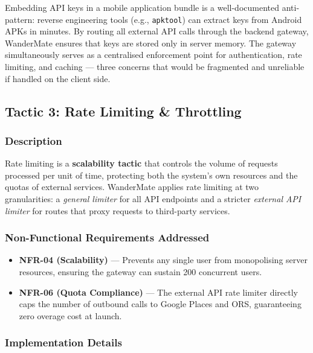 \documentclass[12pt, a4paper]{article}
\newcommand{\code}[1]{\texttt{\small #1}}
\begin{document}
Embedding API keys in a mobile application bundle is a well-documented anti-pattern: reverse engineering tools (e.g., \code{apktool}) can extract keys from Android APKs in minutes. By routing all external API calls through the backend gateway, WanderMate ensures that keys are stored only in server memory. The gateway simultaneously serves as a centralised enforcement point for authentication, rate limiting, and caching --- three concerns that would be fragmented and unreliable if handled on the client side.

\subsection{Tactic 3: Rate Limiting \& Throttling}

\subsubsection{Description}

Rate limiting is a \textbf{scalability tactic} that controls the volume of requests processed per unit of time, protecting both the system's own resources and the quotas of external services. WanderMate applies rate limiting at two granularities: a \emph{general limiter} for all API endpoints and a stricter \emph{external API limiter} for routes that proxy requests to third-party services.

\subsubsection{Non-Functional Requirements Addressed}

\begin{itemize}
  \item \textbf{NFR-04 (Scalability)} --- Prevents any single user from monopolising server resources, ensuring the gateway can sustain 200 concurrent users.
  \item \textbf{NFR-06 (Quota Compliance)} --- The external API rate limiter directly caps the number of outbound calls to Google Places and ORS, guaranteeing zero overage cost at launch.
\end{itemize}

\subsubsection{Implementation Details}
\end{document}
